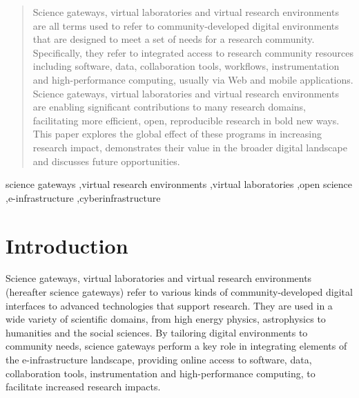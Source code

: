 \documentclass[review]{elsarticle}
\begin{document}
\begin{frontmatter}
\author[neil]{Neil Chue Hong} 
\address[neil]{University of Edinburgh, UK}

\author[alex]{Alessandro Costa}
\address[alex]{INAF, Italy}



\begin{abstract}
Science gateways, virtual laboratories and virtual research environments are all terms used to refer to community-developed digital environments that are designed to meet a set of needs for a research community. Specifically, they refer to integrated access to research community resources including software, data, collaboration tools, workflows, instrumentation and high-performance computing, usually via Web and mobile applications. Science gateways, virtual laboratories and virtual research environments are enabling significant contributions to many research domains, facilitating more efficient, open, reproducible research in bold new ways. This paper explores the global effect of these programs in increasing research impact, demonstrates their value in the broader digital landscape and discusses future opportunities.
\end{abstract}

\begin{keyword}
science gateways \sep virtual research environments \sep virtual laboratories \sep open science \sep e-infrastructure \sep cyberinfrastructure
\end{keyword}

\end{frontmatter}

\linenumbers

\section{Introduction}

Science gateways, virtual laboratories and virtual research environments (hereafter science gateways) refer to various kinds of community-developed digital interfaces to advanced technologies that support research. They are used in a wide variety of scientific domains, from high energy physics, astrophysics to humanities and the social sciences. By tailoring digital environments to community needs, science gateways perform a key role in integrating elements of the e-infrastructure landscape, providing online access to software, data, collaboration tools, instrumentation and high-performance computing, to facilitate increased research impacts.
\end{document}
